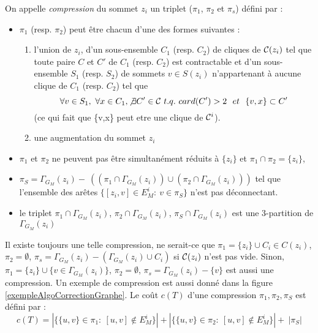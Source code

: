 \begin{definition}
On appelle {\em compression} du sommet $z_i$ un triplet ($\pi_1$, $\pi_2$ et $\pi_s$) d\'efini par : 
\begin{itemize}
	\item $\pi_1$ (resp. $\pi_2$) peut \^etre  chacun d'une des formes suivantes :
	\begin{enumerate}
		\item l'union de $z_i$, d'un sous-ensemble $C_1$ (resp. $C_2$) de cliques de ${\cal C}(z_i)$ tel que toute paire $C$ et $C'$ de $C_1$ (resp. $C_2$) est contractable et d'un sous-ensemble $S_1$ (resp. $S_2$) de sommets $v \in S(z_i)$ n'appartenant \`a aucune clique de $C_1$ (resp. $C_2$) tel que
		$$ \forall v \in S_1,~\forall x \in C_1, \not\exists C' \in {\cal C}~t.q.~card(C')>2~~et~~\{v,x\} \subset C'$$
		(ce qui fait que \{v,x\} peut etre une clique de ${\cal C}^i$).
		\item une augmentation du sommet $z_i$
	\end{enumerate}
	\item $\pi_1$ et $\pi_2$ ne peuvent pas \^etre simultan\'ement r\'eduits \`a $\{z_i\}$ et $\pi_1 \cap \pi_2 = \{z_i\}$,
	\item $\pi_S=\Gamma_{G_M}(z_i)-~((\pi_1 \cap \Gamma_{G_M}(z_i) ) \cup(\pi_2 \cap \Gamma_{G_M}(z_i) ))$ tel que l'ensemble des ar\^etes  $\{[z_i,v]\in E_{M}^{i}:~v\in \pi_S\}$ n'est pas d\'econnectant.
	\item le triplet $\pi_{1} \cap \Gamma_{G_M}(z_i)$, $\pi_{2} \cap \Gamma_{G_M}(z_i)$, $\pi_{S} \cap \Gamma_{G_M}(z_i)$  est une 3-partition de $\Gamma_{G_M}(z_i)$
\end{itemize}
\end{definition}
Il existe toujours une telle compression, ne serait-ce que 
$\pi_1 = \{z_i\} \cup C_i \in C(z_i)$, 
$\pi_2 =  \emptyset$,
$\pi_s = \Gamma_{G_M}(z_i) -(\Gamma_{G_M}(z_i) \cup C_i) $  si ${\cal C}(z_i)$ n'est pas vide.
Sinon, 
$\pi_1 = \{z_i\} \cup \{ v \in \Gamma_{G_M}(z_i)  \} $, 
$\pi_2 =  \emptyset$,
$\pi_s = \Gamma_{G_M}(z_i) - \{v\} $
est aussi une compression.
Un exemple de compression est aussi donn\'e dans la figure \ref{exempleAlgoCorrectionGraphe}.
Le co\^ut $c(T)$ d'une compression $\pi_{1},\pi_{2},\pi_{S}$ est d\'efini par : 
$$c(T) = | \{\{u,v\} \in \pi_{1}:~[u,v]\not\in E_{M}^{i}\}| + |\{\{u,v\} \in \pi_2:~[u,v]\not\in E_{M}^{i}\}| +~ |\pi_S| $$
